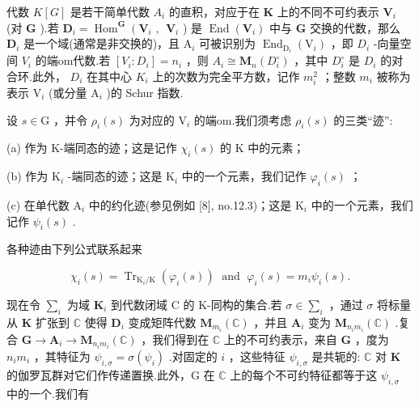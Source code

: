 \documentclass[10pt]{article}
\begin{document}
代数 \(K\left\lbrack  G\right\rbrack\) 是若干简单代数 \({A}_{i}\) 的直积，对应于在 \(\mathbf{K}\) 上的不同不可约表示 \({\mathbf{V}}_{i}\) (对 \(\mathbf{G}\) ).若 \({\mathbf{D}}_{i} = {\operatorname{Hom}}^{\mathbf{G}}\left( {{\mathbf{V}}_{i}\text{ , }}\right. \; {\mathbf{V}}_{i}\) ) 是 \(\operatorname{End}\left( {\mathbf{V}}_{i}\right)\) 中与 \(\mathbf{G}\) 交换的代数，那么 \({\mathbf{D}}_{i}\) 是一个域(通常是非交换的)，且 \({\mathrm{A}}_{i}\) 可被识别为 \({\operatorname{End}}_{{\mathrm{D}}_{i}}\left( {\mathrm{V}}_{i}\right)\) ，即 \({D}_{i}\) -向量空间 \({V}_{i}\) 的端om代数.若 \(\left\lbrack  {{V}_{i} : {D}_{i}}\right\rbrack   = {n}_{i}\) ，则 \({A}_{i} \cong  {\mathbf{M}}_{n}\left( {D}_{i}^{ \circ  }\right)\) ，其中 \({D}_{i}^{ \circ  }\) 是 \({D}_{i}\) 的对合环.此外， \({D}_{i}\) 在其中心 \({K}_{i}\) 上的次数为完全平方数，记作 \({m}_{i}^{2}\) ；整数 \({m}_{i}\) 被称为表示 \({\mathrm{V}}_{i}\) (或分量 \({\mathrm{A}}_{i}\) )的 Schur 指数.

设 \(s \in  \mathrm{G}\) ，并令 \({\rho }_{i}\left( s\right)\) 为对应的 \({\mathrm{V}}_{i}\) 的端om.我们须考虑 \({\rho }_{i}\left( s\right)\) 的三类“迹”:

(a) 作为 K-端同态的迹；这是记作 \({\chi }_{i}\left( s\right)\) 的 K 中的元素；

(b) 作为 \({\mathrm{K}}_{i}\) -端同态的迹；这是 \({\mathrm{K}}_{i}\) 中的一个元素，我们记作 \({\varphi }_{i}\left( s\right)\) ；

(c) 在单代数 \({\mathrm{A}}_{i}\) 中的约化迹(参见例如 [8], no.12.3)；这是 \({\mathrm{K}}_{i}\) 中的一个元素，我们记作 \({\psi }_{i}\left( s\right)\) .

各种迹由下列公式联系起来

\[
{\chi }_{i}\left( s\right)  = {\operatorname{Tr}}_{{\mathrm{K}}_{i}/\mathrm{K}}\left( {{\varphi }_{i}\left( s\right) }\right) \;\text{ and }\;{\varphi }_{i}\left( s\right)  = {m}_{i}{\psi }_{i}\left( s\right) .
\]

现在令 \({\sum }_{i}\) 为域 \({\mathbf{K}}_{i}\) 到代数闭域 C 的 K-同构的集合.若 \(\sigma  \in  {\sum }_{i}\) ，通过 \(\sigma\) 将标量从 \(\mathbf{K}\) 扩张到 \(\mathbb{C}\) 使得 \({\mathbf{D}}_{i}\) 变成矩阵代数 \({\mathbf{M}}_{{m}_{i}}\left( \mathbb{C}\right)\) ，并且 \({\mathbf{A}}_{i}\) 变为 \({\mathbf{M}}_{{n}_{i}{m}_{i}}\left( \mathbb{C}\right)\) .复合 \(\mathbf{G} \rightarrow  {\mathbf{A}}_{i} \rightarrow  {\mathbf{M}}_{{n}_{i}{m}_{i}}\left( \mathbb{C}\right)\) ，我们得到在 \(\mathbb{C}\) 上的不可约表示，来自 \(\mathbf{G}\) ，度为 \({n}_{i}{m}_{i}\) ，其特征为 \({\psi }_{i,\sigma } = \sigma \left( {\psi }_{i}\right)\) .对固定的 \(i\) ，这些特征 \({\psi }_{i,\sigma }\) 是共轭的: \(\mathbb{C}\) 对 \(\mathbf{K}\) 的伽罗瓦群对它们作传递置换.此外，G 在 \(\mathbb{C}\) 上的每个不可约特征都等于这 \({\psi }_{i,\sigma }\) 中的一个.我们有
\end{document}

